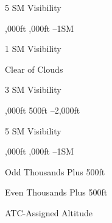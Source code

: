 \documentclass{article}
\begin{document}
\begin{multicols*}{2}

    \begin{notelist}
      \item 5 SM Visibility
      \item {},000ft ,000ft --1SM
    \end{notelist}



    \begin{notelist}
      \item 1 SM Visibility
      \item Clear of Clouds
    \end{notelist}


    \begin{notelist}
      \item 3 SM Visibility
      \item {},000ft \textdownarrow 500ft --2,000ft
    \end{notelist}


    \begin{notelist}
      \item 5 SM Visibility
      \item {},000ft ,000ft --1SM
    \end{notelist}




    \begin{notelist}
      \item Odd Thousands Plus 500ft
    \end{notelist}


    \begin{notelist}
      \item Even Thousands Plus 500ft
    \end{notelist}


    \begin{notelist}
      \item ATC-Assigned Altitude
    \end{notelist}


    \begin{clitemize}
    \end{clitemize}

  \end{multicols*}
\end{document}
